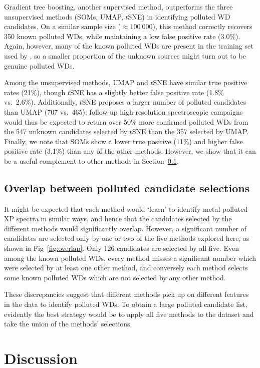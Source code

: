 \documentclass[fleqn,usenatbib]{rasti}
\begin{document}
Gradient tree boosting, another supervised method, outperforms the three unsupervised methods (SOMs, UMAP, $t$SNE) in identifying polluted WD candidates.
On a similar sample size ($\approx 100~000$), this method correctly recovers 350 known polluted WDs, while maintaining a low false positive rate ($3.0\%$).
Again, however, many of the known polluted WDs are present in the training set used by \citet{vincent24}, so a smaller proportion of the unknown sources might turn out to be genuine polluted WDs.

Among the unsupervised methods, UMAP and $t$SNE have similar true positive rates (21\%), though $t$SNE has a slightly better false positive rate (1.8\% vs.\ 2.6\%).
Additionally, $t$SNE proposes a larger number of polluted candidates than UMAP (707 vs.\ 465); follow-up high-resolution spectroscopic campaigns would thus be expected to return over 50\% more confirmed polluted WDs from the 547 unknown candidates selected by $t$SNE than the 357 selected by UMAP.
Finally, we note that SOMs show a lower true positive (11\%) and higher false positive rate (3.1\%) than any of the other methods.
However, we show that it can be a useful complement to other methods in Section~\ref{sec:results/overlap}.


\subsection{Overlap between polluted candidate selections} \label{sec:results/overlap}

It might be expected that each method would `learn' to identify metal-polluted XP spectra in similar ways, and hence that the candidates selected by the different methods would significantly overlap.
However, a significant number of candidates are selected only by one or two of the five methods explored here, as shown in Fig~\ref{fig:overlap}.
Only 126 candidates are selected by all five.
Even among the known polluted WDs, every method misses a significant number which were selected by at least one other method, and conversely each method selects some known polluted WDs which are not selected by any other method.

These discrepancies suggest that different methods pick up on different features in the data to identify polluted WDs.
To obtain a large polluted candidate list, evidently the best strategy would be to apply all five methods to the dataset and take the union of the methods' selections.


\section{Discussion} \label{sec:discussion}
\end{document}
